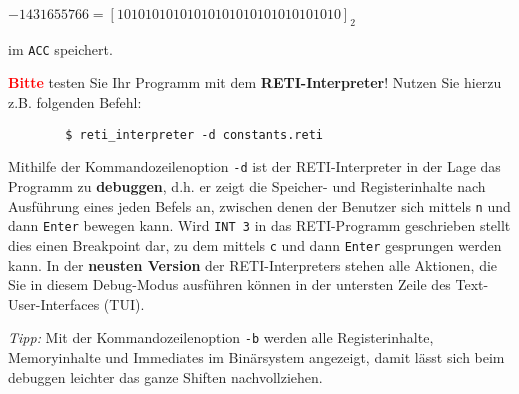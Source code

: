 \documentclass{article}
\begin{document}
	$-1431655766 = [10101010101010101010101010101010]_2$

	im \texttt{ACC} speichert.

  {\LARGE\bfseries\textcolor{red}{Bitte}} testen Sie Ihr Programm mit dem \textbf{RETI-Interpreter}! Nutzen Sie hierzu z.B. folgenden Befehl:
	\begin{verbatim}
		$ reti_interpreter -d constants.reti
	\end{verbatim}

  {\color{green}
Mithilfe der Kommandozeilenoption \verb|-d| ist der RETI-Interpreter in der Lage das Programm zu \textbf{debuggen}, d.h. er zeigt die Speicher- und Registerinhalte nach Ausführung eines jeden Befels an, zwischen denen der Benutzer sich mittels \verb|n| und dann \verb|Enter| bewegen kann. Wird \verb|INT 3| in das RETI-Programm geschrieben stellt dies einen Breakpoint dar, zu dem mittels \verb|c| und dann \verb|Enter| gesprungen werden kann. In der \textbf{neusten Version} der RETI-Interpreters stehen alle Aktionen, die Sie in diesem Debug-Modus ausführen können in der untersten Zeile des Text-User-Interfaces (TUI).

\textit{Tipp:} Mit der Kommandozeilenoption \verb|-b| werden alle Registerinhalte, Memoryinhalte und Immediates im Binärsystem angezeigt, damit lässt sich beim debuggen leichter das ganze Shiften nachvollziehen.
}

\end{document}

